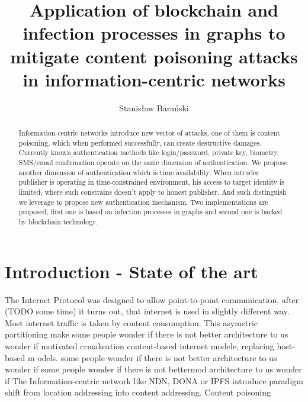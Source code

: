 \documentclass[runningheads]{llncs}
\begin{document}
%
\title{Application of blockchain and infection processes in graphs to
mitigate content poisoning attacks in information-centric networks}
%
%
\author{Stanisław Barański}

%
%
\maketitle              %
%
\begin{abstract}
Information-centric networks introduce new vector of attacks, one of them is content poisoning, which when performed successfully, can create destructive damages. Currently known authentication methods like login/password, private key, biometry, SMS/email confirmation operate on the same dimension of authentication. We propose another dimension of authentication which is time availability. When intruder publisher is operating in time-constrained environment, his access to target identity is limited, where such constrains doesn't apply to honest publisher. And such distinguish we leverage to propose new authentication mechanism. Two implementations are proposed, first one is based on infection processes in graphs and second one is backed by blockchain technology. 

\end{abstract}


\section{Introduction - State of the art}
The Internet Protocol was designed to allow point-to-point communication, after (TODO some time) it turns out, that internet is used in slightly different way. Most internet traffic is taken by content consumption. This asymetric partitioning make some people wonder if there is not better architecture to  us wonder if  
motivated crmakeation content-based internet modele, replacing host-based m odels. some people wonder if there is not better architecture to  us wonder if  
 some people wonder if there is not bettermod architecture to  us wonder if  
The Information-centric network like NDN, DONA or IPFS introduce paradigm shift from location addressing into content addressing. 
Content poisoning 
\end{document}
